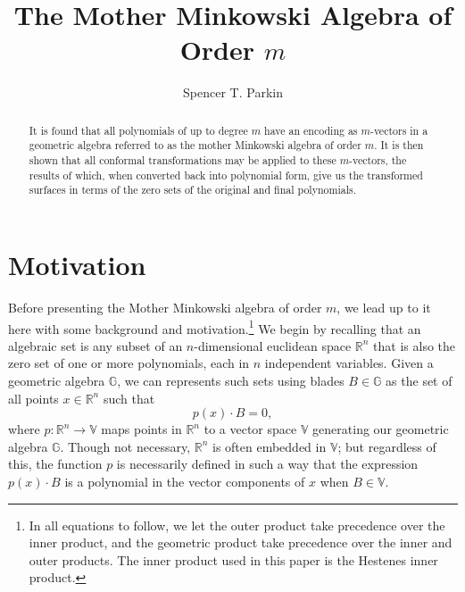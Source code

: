 \documentclass{ecgd-l}
\theoremstyle{definition}
\theoremstyle{remark}
\numberwithin{equation}{section}
\newcommand{\R}{\mathbb{R}}
\newcommand{\G}{\mathbb{G}}
\newcommand{\V}{\mathbb{V}}
\begin{document}
\title{The Mother Minkowski Algebra of Order $m$}

\author{Spencer T. Parkin}
\address{102 W. 500 S., Salt Lake City, UT  84101}



\begin{abstract}
It is found that all polynomials of up to degree $m$
have an encoding as $m$-vectors in a geometric algebra referred
to as the mother Minkowski algebra of order $m$.
It is then shown that all conformal transformations may be
applied to these $m$-vectors, the results of which, when converted
back into polynomial form, give us the transformed surfaces in terms
of the zero sets of the original and final polynomials.
\end{abstract}

\maketitle

\section{Motivation}

Before presenting the Mother Minkowski algebra of order $m$, we lead up to it here with
some background and motivation.\footnote{In all equations to follow, we let the
outer product take precedence over the inner product, and the geometric product
take precedence over the inner and outer products.  The inner product used in this
paper is the Hestenes inner product.}  We begin by recalling that an algebraic set is any 
subset of an $n$-dimensional euclidean space $\R^n$ that is also the zero set of one
or more polynomials, each in $n$ independent variables.  Given a geometric algebra $\G$, we can represents such sets
using blades $B\in\G$ as the set of all points $x\in\R^n$ such that
\begin{equation*}
p(x)\cdot B=0,
\end{equation*}
where $p:\R^n\to\V$ maps points in $\R^n$ to a vector space $\V$ generating
our geometric algebra $\G$.  Though not necessary, $\R^n$ is often embedded in $\V$;
but regardless of this, the function $p$ is necessarily defined in such a way that the expression
$p(x)\cdot B$ is a polynomial in the vector components of $x$ when $B\in\V$.
\end{document}
